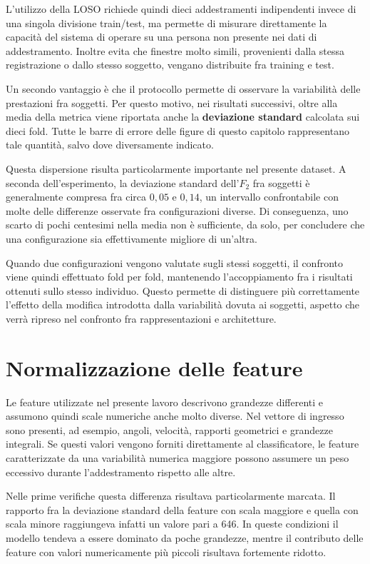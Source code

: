 L'utilizzo della LOSO richiede quindi dieci addestramenti indipendenti invece di una singola divisione train/test, ma permette di misurare direttamente la capacità del sistema di operare su una persona non presente nei dati di addestramento. Inoltre evita che finestre molto simili, provenienti dalla stessa registrazione o dallo stesso soggetto, vengano distribuite fra training e test.

Un secondo vantaggio è che il protocollo permette di osservare la variabilità delle prestazioni fra soggetti. Per questo motivo, nei risultati successivi, oltre alla media della metrica viene riportata anche la \textbf{deviazione standard} calcolata sui dieci fold. Tutte le barre di errore delle figure di questo capitolo rappresentano tale quantità, salvo dove diversamente indicato.

Questa dispersione risulta particolarmente importante nel presente dataset. A seconda dell'esperimento, la deviazione standard dell'$F_2$ fra soggetti è generalmente compresa fra circa $0{,}05$ e $0{,}14$, un intervallo confrontabile con molte delle differenze osservate fra configurazioni diverse. Di conseguenza, uno scarto di pochi centesimi nella media non è sufficiente, da solo, per concludere che una configurazione sia effettivamente migliore di un'altra.

Quando due configurazioni vengono valutate sugli stessi soggetti, il confronto viene quindi effettuato fold per fold, mantenendo l'accoppiamento fra i risultati ottenuti sullo stesso individuo. Questo permette di distinguere più correttamente l'effetto della modifica introdotta dalla variabilità dovuta ai soggetti, aspetto che verrà ripreso nel confronto fra rappresentazioni e architetture.

\section{Normalizzazione delle feature}
\label{sec:normalizzazione}

Le feature utilizzate nel presente lavoro descrivono grandezze differenti e assumono quindi scale numeriche anche molto diverse. Nel vettore di ingresso sono presenti, ad esempio, angoli, velocità, rapporti geometrici e grandezze integrali. Se questi valori vengono forniti direttamente al classificatore, le feature caratterizzate da una variabilità numerica maggiore possono assumere un peso eccessivo durante l'addestramento rispetto alle altre.

Nelle prime verifiche questa differenza risultava particolarmente marcata. Il rapporto fra la deviazione standard della feature con scala maggiore e quella con scala minore raggiungeva infatti un valore pari a 646. In queste condizioni il modello tendeva a essere dominato da poche grandezze, mentre il contributo delle feature con valori numericamente più piccoli risultava fortemente ridotto.

